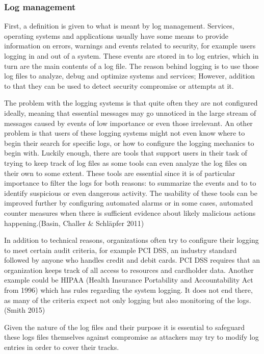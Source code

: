 \documentclass{article}
\begin{document}
\subsubsection{Log management}
First, a definition is given to what is meant by log management. Services, operating systems and applications usually have some means to provide information on errors, warnings and events related to security, for example users logging in and out of a system. These events are stored in to log entries, which in turn are the main contents of a log file. The reason behind logging is to use those log files to analyze, debug and optimize systems and services; However, addition to that they can be used to detect security compromise or attempts at it.
\par
The problem with the logging systems is that quite often they are not configured ideally, meaning that essential messages may go unnoticed in the large stream of messages caused by events of low importance or even those irrelevant. An other problem is that users of these logging systems might not even know where to begin their search for specific logs, or how to configure the logging mechanics to begin with. Luckily enough, there are tools that support users in their task of trying to keep track of log files as some tools can even analyze the log files on their own to some extent. These tools are essential since it is of particular importance to filter the logs for both reasons: to summarize the events and to to identify suspicious or even dangerous activity. The usability of these tools can be improved further by configuring automated alarms or in some cases, automated counter measures when there is sufficient evidence about likely malicious actions happening.(Basin, Challer \& Schläpfer 2011)
\par
In addition to technical reasons, organizations often try to configure their logging to meet certain audit criteria, for example PCI DSS, an industry standard followed by anyone who handles credit and debit cards. PCI DSS requires that an organization keeps track of all access to resources and cardholder data. Another example could be HIPAA (Health Insurance Portability and Accountability Act from 1996) which has rules regarding the system logging. It does not end there, as many of the criteria expect not only logging but also monitoring of the logs. (Smith 2015)
\par
Given the nature of the log files and their purpose it is essential to safeguard these logs files themselves against compromise as attackers may try to modify log entries in order to cover their tracks.
\end{document}
